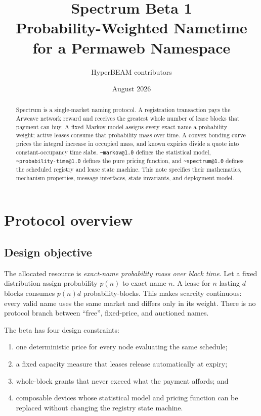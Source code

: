 \documentclass[10pt,twocolumn]{article}
\title{Spectrum Beta 1\\
  \large Probability-Weighted Nametime for a Permaweb Namespace}
\author{HyperBEAM contributors}
\date{August 2026}
\newcommand{\device}[1]{\texttt{\textasciitilde#1}}
\begin{document}
\maketitle

\begin{abstract}
Spectrum is a single-market naming protocol. A registration transaction pays
the Arweave network reward and receives the greatest whole number of lease
blocks that payment can buy. A fixed Markov model assigns every exact name a
probability weight; active leases consume that probability mass over time. A
convex bonding curve prices the integral increase in occupied mass, and known
expiries divide a quote into constant-occupancy time slabs.
\device{markov@1.0} defines the statistical model,
\device{probability-time@1.0} defines the pure pricing function, and
\device{spectrum@1.0} defines the scheduled registry and lease state machine.
This note specifies their mathematics, mechanism properties, message
interfaces, state invariants, and deployment model.
\end{abstract}

\section{Protocol overview}

\subsection{Design objective}

The allocated resource is \emph{exact-name probability mass over block time}.
Let a fixed distribution assign probability $p(n)$ to exact name $n$. A lease
for $n$ lasting $d$ blocks consumes $p(n)d$ probability-blocks. This makes
scarcity continuous: every valid name uses the same market and differs only in
its weight. There is no protocol branch between ``free'', fixed-price, and
auctioned names.

The beta has four design constraints:

\begin{enumerate}
  \item one deterministic price for every node evaluating the same schedule;
  \item a fixed capacity measure that leases release automatically at expiry;
  \item whole-block grants that never exceed what the payment affords; and
  \item composable devices whose statistical model and pricing function can be
        replaced without changing the registry state machine.
\end{enumerate}
\end{document}
